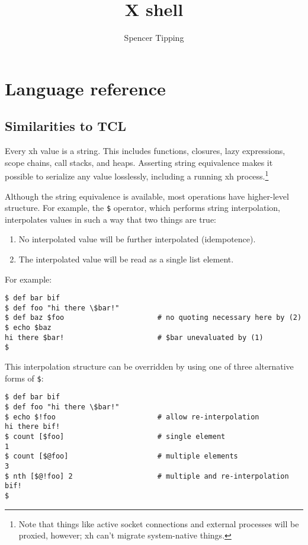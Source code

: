 \documentclass{report}
\title{X shell}
\author{Spencer Tipping}
\begin{document}
\maketitle{}
\tableofcontents{}


\part{Language reference}\label{part:language-reference}
\chapter{Similarities to TCL}\label{chp:similarities-to-tcl}
  Every xh value is a string. This includes functions, closures, lazy
  expressions, scope chains, call stacks, and heaps. Asserting string
  equivalence makes it possible to serialize any value losslessly, including a
  running xh process.\footnote{Note that things like active socket connections
  and external processes will be proxied, however; xh can't migrate
  system-native things.}

  Although the string equivalence is available, most operations have
  higher-level structure. For example, the \verb|$| operator, which performs
  string interpolation, interpolates values in such a way that two things are
  true:

\begin{enumerate}
\item{No interpolated value will be further interpolated (idempotence).}
\item{The interpolated value will be read as a single list element.}
\end{enumerate}

  For example:

\begin{verbatim}
$ def bar bif
$ def foo "hi there \$bar!"
$ def baz $foo                      # no quoting necessary here by (2)
$ echo $baz
hi there $bar!                      # $bar unevaluated by (1)
$
\end{verbatim}

  This interpolation structure can be overridden by using one of three
  alternative forms of \verb|$|:

\begin{verbatim}
$ def bar bif
$ def foo "hi there \$bar!"
$ echo $!foo                        # allow re-interpolation
hi there bif!
$ count [$foo]                      # single element
1
$ count [$@foo]                     # multiple elements
3
$ nth [$@!foo] 2                    # multiple and re-interpolation
bif!
$
\end{verbatim}
\end{document}
